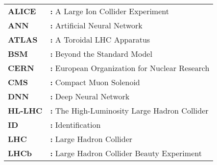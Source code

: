 \begin{tabular}{@{}p{2cm}l}
{\bf ALICE} & {\bf:} A Large Ion Collider Experiment\\
{\bf ANN} & {\bf:} Artificial Neural Network\\
{\bf ATLAS} & {\bf:} A Toroidal LHC Apparatus\\
{\bf BSM} & {\bf:} Beyond the Standard Model\\
{\bf CERN} & {\bf:} European Organization for Nuclear Research\\
{\bf CMS} & {\bf:} Compact Muon Solenoid\\
{\bf DNN} & {\bf:} Deep Neural Network\\
{\bf HL-LHC} & {\bf:} The High-Luminosity Large Hadron Collider\\
{\bf ID} & {\bf:} Identification\\
{\bf LHC} & {\bf:} Large Hadron Collider\\
{\bf LHCb} & {\bf:} Large Hadron Collider Beauty Experiment\\
\end{tabular}


